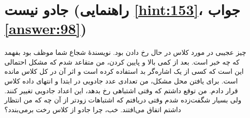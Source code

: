 \section[جادو نیست]{جادو نیست \protect{} (راهنمایی \ref{hint:153}، جواب \ref{answer:98})}
\paragraph{}\label{prog:93}
چیز عجیبی در مورد کلاس  در حال رخ دادن بود. نویسندهٔ شجاع شما موظف بود بفهمد که چه خبر است. بعد از کمی بالا و پایین کردن، من متقاعد شدم که مشکل احتمالی این است که کسی از یک اشاره‌گر بد استفاده کرده است و اثر آن در کل کلاس مانده است.
برای یافتن محل مشکل، من تعدادی عدد جادویی در ابتدا و انتهای داده کلاس قرار دادم. من توقع داشتم که وقتی اشتباهی رخ بدهد، این اعداد جادویی تغییر کنند. ولی بسیار شگفت‌زده شدم وقتی دریافتم که اشتباهات زودتر از آن چه که من انتظار داشتم اتفاق می‌افتند.
خب، چرا جادو از کلاس رخت برمی‌بندد؟

